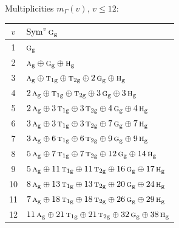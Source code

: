 \documentclass[11pt]{article}
\newcommand{\irr}[1]{\text{\normalfont\scshape #1}}
\newcommand{\ptag}[1]{\mathrm{#1}}
\begin{document}
Multiplicities $m_\Gamma(v)$, $v\le12$:
\begin{longtable}{c l}\hline $v$ & $\operatorname{Sym}^{v}\irr{g}_{\ptag{g}}$\\ \hline\endhead
1 & $\irr{g}_{\ptag{g}}$\\
2 & $\irr{a}_{\ptag{g}}\oplus \irr{g}_{\ptag{g}}\oplus \irr{h}_{\ptag{g}}$\\
3 & $\irr{a}_{\ptag{g}}\oplus \irr{t}_{1\ptag{g}}\oplus \irr{t}_{2\ptag{g}}\oplus 2\,\irr{g}_{\ptag{g}}\oplus \irr{h}_{\ptag{g}}$\\
4 & $2\,\irr{a}_{\ptag{g}}\oplus \irr{t}_{1\ptag{g}}\oplus \irr{t}_{2\ptag{g}}\oplus 3\,\irr{g}_{\ptag{g}}\oplus 3\,\irr{h}_{\ptag{g}}$\\
5 & $2\,\irr{a}_{\ptag{g}}\oplus 3\,\irr{t}_{1\ptag{g}}\oplus 3\,\irr{t}_{2\ptag{g}}\oplus 4\,\irr{g}_{\ptag{g}}\oplus 4\,\irr{h}_{\ptag{g}}$\\
6 & $3\,\irr{a}_{\ptag{g}}\oplus 3\,\irr{t}_{1\ptag{g}}\oplus 3\,\irr{t}_{2\ptag{g}}\oplus 7\,\irr{g}_{\ptag{g}}\oplus 7\,\irr{h}_{\ptag{g}}$\\
7 & $3\,\irr{a}_{\ptag{g}}\oplus 6\,\irr{t}_{1\ptag{g}}\oplus 6\,\irr{t}_{2\ptag{g}}\oplus 9\,\irr{g}_{\ptag{g}}\oplus 9\,\irr{h}_{\ptag{g}}$\\
8 & $5\,\irr{a}_{\ptag{g}}\oplus 7\,\irr{t}_{1\ptag{g}}\oplus 7\,\irr{t}_{2\ptag{g}}\oplus 12\,\irr{g}_{\ptag{g}}\oplus 14\,\irr{h}_{\ptag{g}}$\\
9 & $5\,\irr{a}_{\ptag{g}}\oplus 11\,\irr{t}_{1\ptag{g}}\oplus 11\,\irr{t}_{2\ptag{g}}\oplus 16\,\irr{g}_{\ptag{g}}\oplus 17\,\irr{h}_{\ptag{g}}$\\
10 & $8\,\irr{a}_{\ptag{g}}\oplus 13\,\irr{t}_{1\ptag{g}}\oplus 13\,\irr{t}_{2\ptag{g}}\oplus 20\,\irr{g}_{\ptag{g}}\oplus 24\,\irr{h}_{\ptag{g}}$\\
11 & $7\,\irr{a}_{\ptag{g}}\oplus 18\,\irr{t}_{1\ptag{g}}\oplus 18\,\irr{t}_{2\ptag{g}}\oplus 26\,\irr{g}_{\ptag{g}}\oplus 29\,\irr{h}_{\ptag{g}}$\\
12 & $11\,\irr{a}_{\ptag{g}}\oplus 21\,\irr{t}_{1\ptag{g}}\oplus 21\,\irr{t}_{2\ptag{g}}\oplus 32\,\irr{g}_{\ptag{g}}\oplus 38\,\irr{h}_{\ptag{g}}$\\
\hline\end{longtable}
\end{document}
